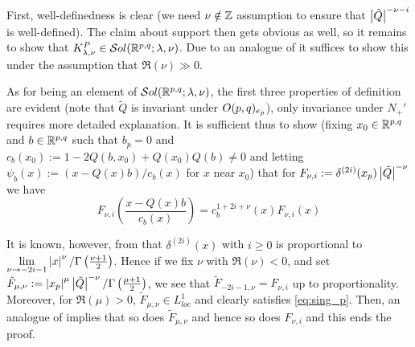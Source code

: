\documentclass[10pt]{article} %
\theoremstyle{definition}
\theoremstyle{remark}
\begin{document}
\begin{myproof}
	First, well-definedness is clear (we need $\nu\notin\mathbb{Z}$ assumption to ensure that $\left|\tilde{Q}\right|^{-\nu-i}$
	is well-defined).
	The claim about support then gets obvious as well, so it remains to show that $K_{\lambda,\nu
	}^P\in\mathcal{S}ol(\mathbb{R}^{p,q};\lambda,\nu)$. Due to 
	an analogue of \cite[prop. 3.18]{kobayashi2015symmetry} it suffices to show this under the assumption that $\Re(\nu)\gg0$.

	As for being an element of $\mathcal{S}ol(\mathbb{R}^{p,q};\lambda,\nu)$, the first three properties of definition are evident (note that $\tilde{Q}$ is
	invariant under $O(p,q)_{e_p}$), only invariance
	under $N_+'$ requires more detailed explanation. It is sufficient thus to show (fixing $x_0\in\mathbb{R}^{p,q}$
	and $b\in\mathbb{R}^{p,q}$ such that $b_p=0$ and $c_b(x_0):=1-2Q(b,x_0)+Q(x_0)Q(b)\neq0$ and letting 
	$\psi_b(x):=(x-Q(x)b)/c_b(x)$ for $x$ near $x_0$) that for $F_{\nu,i}:=\delta^{(2i)}(x_p)\left|\tilde{Q}\right|^{-\nu}$ we have
	\begin{equation}
	F_{\nu,i}\left( \frac{x-Q(x)b}{c_b(x)}\right)=c_b^{1+2i+\nu}(x)F_{\nu,i}(x) 
		\label{eq:sing_p}
	\end{equation}
	
	It is known, however, from \cite[ch. I, sec. 3.5]{gelfand1980distribution}
	that $\delta^{(2i)}(x)$ with $i\geq0$ is proportional to $\lim_{\nu\to-2i-1}\myabs{x}^{\nu}/\Gamma\left( \frac{\nu+1}{2}
	\right)$. Hence if we fix $\nu$ with $\Re(\nu)<0$,
	and set $\tilde{F}_{\mu,\nu}:=\left|x_p\right|^{\mu}\left|\tilde{Q}\right|^{-\nu}/\Gamma\left( \frac{\mu
	+1}{2} \right)$, we see that $\tilde{F}_{-2i-1,\nu}=F_{\nu,i}$ up to proportionality. Moreover, for $\Re(\mu)>0$,
	$\tilde{F}_{\mu,\nu}\in L^1_{loc}$ and clearly satisfies \eqref{eq:sing_p}. 
	Then, an analogue of \cite[prop. 3.18]{kobayashi2015symmetry}
	implies that so does $\tilde{F}_{\mu,\nu}$ and hence so does $F_{\nu,i}$ and this ends the proof.
\end{myproof}
\end{document}
